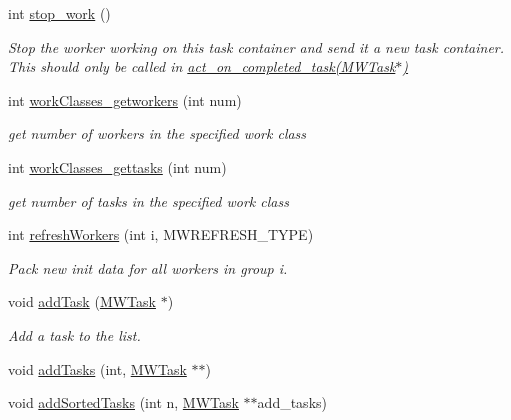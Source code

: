 \begin{DoxyCompactItemize}
\mbox{\label{classMWDriver_a62ee843c55a50415b8c96c552267bd48}} 
int \hyperlink{classMWDriver_a62ee843c55a50415b8c96c552267bd48}{stop\+\_\+work} ()
\begin{DoxyCompactList}\small\item\em Stop the worker working on this task container and send it a new task container. This should only be called in \hyperlink{classMWDriver_a920118e3f49ab81db5047d9ecdbcea2b}{act\+\_\+on\+\_\+completed\+\_\+task(\+M\+W\+Task$\ast$)} \end{DoxyCompactList}\item 
\mbox{\label{classMWDriver_a31d60231d425b490ebca37dae8ffd47a}} 
int \hyperlink{classMWDriver_a31d60231d425b490ebca37dae8ffd47a}{work\+Classes\+\_\+getworkers} (int num)
\begin{DoxyCompactList}\small\item\em get number of workers in the specified work class \end{DoxyCompactList}\item 
\mbox{\label{classMWDriver_a0cbd67b86b21fa4676884107bdd48fce}} 
int \hyperlink{classMWDriver_a0cbd67b86b21fa4676884107bdd48fce}{work\+Classes\+\_\+gettasks} (int num)
\begin{DoxyCompactList}\small\item\em get number of tasks in the specified work class \end{DoxyCompactList}\item 
\mbox{\label{classMWDriver_a9dc5f80c5069e9bddcfee2ad9e5e32e4}} 
int \hyperlink{classMWDriver_a9dc5f80c5069e9bddcfee2ad9e5e32e4}{refresh\+Workers} (int i, M\+W\+R\+E\+F\+R\+E\+S\+H\+\_\+\+T\+Y\+PE)
\begin{DoxyCompactList}\small\item\em Pack new init data for all workers in group i. \end{DoxyCompactList}\item 
\mbox{\label{classMWDriver_aa044c3810502c18efcb32dc77a66a138}} 
void \hyperlink{classMWDriver_aa044c3810502c18efcb32dc77a66a138}{add\+Task} (\hyperlink{classMWTask}{M\+W\+Task} $\ast$)
\begin{DoxyCompactList}\small\item\em Add a task to the list. \end{DoxyCompactList}\item 
void \hyperlink{classMWDriver_a8b8a9ff2699780ce52ae600b658c9e4f}{add\+Tasks} (int, \hyperlink{classMWTask}{M\+W\+Task} $\ast$$\ast$)
\item 
void \hyperlink{classMWDriver_a0dfb4201b9bce44ba2a59019f7fc2dd2}{add\+Sorted\+Tasks} (int n, \hyperlink{classMWTask}{M\+W\+Task} $\ast$$\ast$add\+\_\+tasks)
\end{DoxyCompactItemize}
